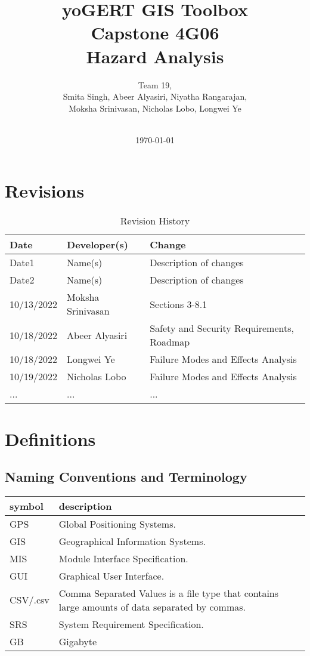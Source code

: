 \documentclass{article}
\title{\textbf{yoGERT GIS Toolbox}\\ Capstone 4G06\\ Hazard Analysis}
\author{Team 19,
		\\ Smita Singh, Abeer Alyasiri, Niyatha Rangarajan,\\ Moksha Srinivasan, Nicholas Lobo, Longwei Ye \\\\
}
\date{\today}
\begin{document}
\nocite{*}
\maketitle

\newpage

\tableofcontents
\listoftables
\listoffigures

\section{Revisions}

\begin{table}[hp]
\caption{Revision History} \label{TblRevisionHistory}
\begin{tabularx}{\textwidth}{llX}
\toprule
\textbf{Date} & \textbf{Developer(s)} & \textbf{Change}\\
\midrule
Date1 & Name(s) & Description of changes\\
Date2 & Name(s) & Description of changes\\
10/13/2022 & Moksha Srinivasan & Sections 3-8.1\\
10/18/2022 & Abeer Alyasiri & Safety and Security Requirements, Roadmap\\
10/18/2022 & Longwei Ye & Failure Modes and Effects Analysis\\
10/19/2022 & Nicholas Lobo & Failure Modes and Effects Analysis\\
... & ... & ...\\
\bottomrule
\end{tabularx}
\end{table}

\section{Definitions}
\subsection{Naming Conventions and Terminology}
\begin{tabular}{l p{6cm}} 
  \toprule		
  \textbf{symbol} & \textbf{description}\\
  \midrule 
  GPS & Global Positioning Systems.\\
  GIS & Geographical Information Systems.\\
  MIS & Module Interface Specification.\\
  GUI & Graphical User Interface. \\
  CSV/.csv & Comma Separated Values is a file type that contains large amounts of data separated by commas.\\
  SRS & System Requirement Specification.\\
  GB & Gigabyte \\

  \bottomrule
\end{tabular}\\
\end{document}

